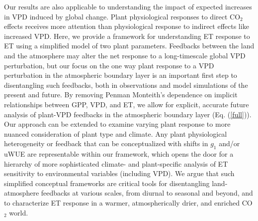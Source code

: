 Our results are also applicable to understanding the impact of
expected increases in VPD induced by global change.  Plant
physiological responses to direct CO$_2$ effects
\citep[e.g.,][]{Swann_2016, Lemordant_2018} receives more attention
than physiological response to indirect effects like increased
VPD. Here, we provide a framework for understanding ET response to ET
using a simplified model of two plant parameters. Feedbacks between the
land and the atmosphere may alter the net response to a long-timescale
global VPD perturbation, but our focus on the one way plant response
to a VPD perturbation in the atmospheric boundary layer is an
important first step to disentangling such feedbacks, both in
observations and model simulations of the present and future. By
removing Penman Monteith's dependence on implicit relationships
between GPP, VPD, and ET, we allow for explicit, accurate future
analysis of plant-VPD feedbacks in the atmospheric boundary layer
(Eq. (\ref{full})). Our approach can be extended to examine varying
plant response to more nuanced consideration of plant type and
climate. Any plant physiological heterogeneity or feedback that can be
conceptualized with shifts in $g_1$ \citep[e.g.][]{Lin_2015,
Medlyn_2017} and/or uWUE \citep[e.g.][]{Zhou_2014} are representable
within our framework, which opens the door for a hierarchy of more
sophisticated climate- and plant-specific analysis of ET sensitivity
to environmental variables (including VPD). We argue that such
simplified conceptual frameworks are critical tools for disentangling
land-atmosphere feedbacks at various scales, from diurnal to seasonal
and beyond, and to characterize ET response in a warmer,
atmospherically drier, and enriched CO$_2$ world.
